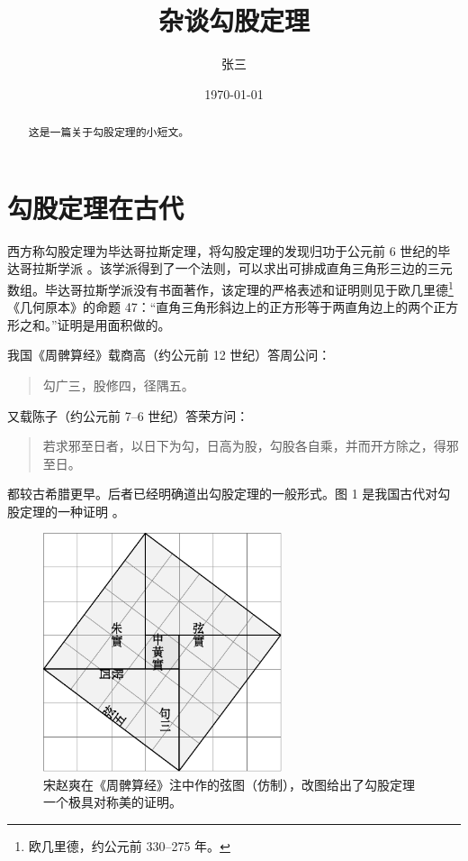 \documentclass[UTF8]{ctexart}
\title{杂谈勾股定理}
\author{张三}
\date{\today}
\newenvironment{myquote}
 {\begin{quote}\kaishu\zihao{-5}}
 {\end{quote}}
\begin{document}
\maketitle
\begin{abstract}
这是一篇关于勾股定理的小短文。
\end{abstract}

\tableofcontents

\section{勾股定理在古代}
\label{sec:ancient}

西方称勾股定理为毕达哥拉斯定理，将勾股定理的发现归功于公元前 6 世纪的毕达哥拉斯学派 \cite{Kline}。该学派得到了一个法则，可以求出可排成直角三角形三边的三元数组。毕达哥拉斯学派没有书面著作，该定理的严格表述和证明则见于欧几里德\footnote{欧几里德，约公元前 330--275 年。}《几何原本》的命题 47：“直角三角形斜边上的正方形等于两直角边上的两个正方形之和。”证明是用面积做的。

我国《周髀算经》载商高（约公元前 12 世纪）答周公问：
\begin{myquote}
勾广三，股修四，径隅五。%
\end{myquote}

又载陈子（约公元前 7--6 世纪）答荣方问：
\begin{quote}
\kaishu 若求邪至日者，以日下为勾，日高为股，勾股各自乘，并而开方除之，得邪至日。
\end{quote}
都较古希腊更早。后者已经明确道出勾股定理的一般形式。图 1 是我国古代对勾股定理的一种证明 \cite{quanjing}。

\begin{figure}[ht]
	\centering
	\includegraphics[width=7cm]{xiantu.pdf}
	\caption{宋赵爽在《周髀算经》注中作的弦图（仿制），改图给出了勾股定理一个极具对称美的证明。}
	\label{fig:xiantu}
\end{figure}
\end{document}
